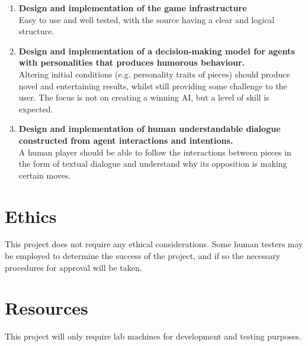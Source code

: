 \documentclass[12pt]{extarticle}
\newcommand\descitem[1]{\item{\bfseries #1}\\}
\begin{document}
\begin{enumerate}
		\descitem{Design and implementation of the game infrastructure} 
		Easy to use and well tested, with the source having a clear and logical structure. 

		\descitem{Design and implementation of a decision-making model for agents with personalities that produces humorous behaviour.} 
		Altering initial conditions (e.g. personality traits of pieces) should produce novel and entertaining results, whilst still providing some challenge to the user. The focus is not on creating a winning AI, but a level of skill is expected.

		\descitem {Design and implementation of human understandable dialogue constructed from agent interactions and intentions.} 
		A human player should be able to follow the interactions between pieces in the form of textual dialogue and understand why its opposition is making certain moves. 

\end{enumerate}

\section*{Ethics}

This project does not require any ethical considerations. Some human testers may be employed to determine the success of the project, and if so the necessary procedures for approval will be taken.

\section*{Resources}

This project will only require lab machines for development and testing purposes.
\end{document}
